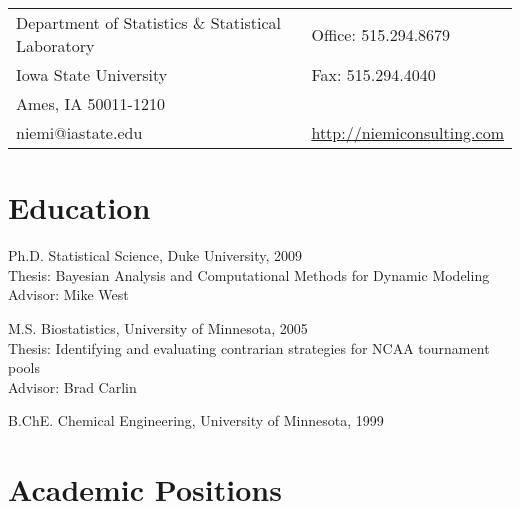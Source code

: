 \documentclass[overlapped,line,letterpaper]{res}
\begin{document}

\setlength{\leftmargini}{0em}
\renewcommand{\labelitemi}{}

\renewcommand{\namefont}{\large\textbf}



\begin{resume}

\begin{tabular}{ll}
  Department of Statistics \& Statistical Laboratory    & Office: 515.294.8679 \\
  Iowa State University                   &  Fax: \hspace{.07in} 515.294.4040 \\
  Ames, IA 50011-1210        & \\
  niemi@iastate.edu  & \url{http://niemiconsulting.com}
\end{tabular}




\section{\bf Education}
Ph.D. Statistical Science, Duke University, 2009 \\%
Thesis: Bayesian Analysis and Computational Methods for Dynamic Modeling\\
Advisor: Mike West

M.S. Biostatistics, University of Minnesota, 2005\\%
Thesis: Identifying and evaluating contrarian strategies for NCAA tournament pools \\
Advisor: Brad Carlin

B.ChE. Chemical Engineering, University of Minnesota, 1999%



\section{\bf Academic Positions}


\end{resume}
\end{document}
